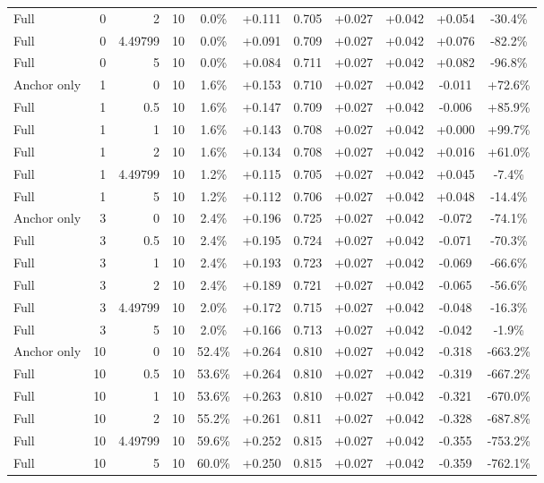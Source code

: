 \begin{table}[htbp]
\begin{tabular}{lrrrccccccc}
Full & 0 & 2 & 10 & 0.0\% & +0.111 & 0.705 & +0.027 & +0.042 & +0.054 & -30.4\% \\
Full & 0 & 4.49799 & 10 & 0.0\% & +0.091 & 0.709 & +0.027 & +0.042 & +0.076 & -82.2\% \\
Full & 0 & 5 & 10 & 0.0\% & +0.084 & 0.711 & +0.027 & +0.042 & +0.082 & -96.8\% \\
Anchor only & 1 & 0 & 10 & 1.6\% & +0.153 & 0.710 & +0.027 & +0.042 & -0.011 & +72.6\% \\
Full & 1 & 0.5 & 10 & 1.6\% & +0.147 & 0.709 & +0.027 & +0.042 & -0.006 & +85.9\% \\
Full & 1 & 1 & 10 & 1.6\% & +0.143 & 0.708 & +0.027 & +0.042 & +0.000 & +99.7\% \\
Full & 1 & 2 & 10 & 1.6\% & +0.134 & 0.708 & +0.027 & +0.042 & +0.016 & +61.0\% \\
Full & 1 & 4.49799 & 10 & 1.2\% & +0.115 & 0.705 & +0.027 & +0.042 & +0.045 & -7.4\% \\
Full & 1 & 5 & 10 & 1.2\% & +0.112 & 0.706 & +0.027 & +0.042 & +0.048 & -14.4\% \\
Anchor only & 3 & 0 & 10 & 2.4\% & +0.196 & 0.725 & +0.027 & +0.042 & -0.072 & -74.1\% \\
Full & 3 & 0.5 & 10 & 2.4\% & +0.195 & 0.724 & +0.027 & +0.042 & -0.071 & -70.3\% \\
Full & 3 & 1 & 10 & 2.4\% & +0.193 & 0.723 & +0.027 & +0.042 & -0.069 & -66.6\% \\
Full & 3 & 2 & 10 & 2.4\% & +0.189 & 0.721 & +0.027 & +0.042 & -0.065 & -56.6\% \\
Full & 3 & 4.49799 & 10 & 2.0\% & +0.172 & 0.715 & +0.027 & +0.042 & -0.048 & -16.3\% \\
Full & 3 & 5 & 10 & 2.0\% & +0.166 & 0.713 & +0.027 & +0.042 & -0.042 & -1.9\% \\
Anchor only & 10 & 0 & 10 & 52.4\% & +0.264 & 0.810 & +0.027 & +0.042 & -0.318 & -663.2\% \\
Full & 10 & 0.5 & 10 & 53.6\% & +0.264 & 0.810 & +0.027 & +0.042 & -0.319 & -667.2\% \\
Full & 10 & 1 & 10 & 53.6\% & +0.263 & 0.810 & +0.027 & +0.042 & -0.321 & -670.0\% \\
Full & 10 & 2 & 10 & 55.2\% & +0.261 & 0.811 & +0.027 & +0.042 & -0.328 & -687.8\% \\
Full & 10 & 4.49799 & 10 & 59.6\% & +0.252 & 0.815 & +0.027 & +0.042 & -0.355 & -753.2\% \\
Full & 10 & 5 & 10 & 60.0\% & +0.250 & 0.815 & +0.027 & +0.042 & -0.359 & -762.1\% \\

\end{tabular}
\end{table}
